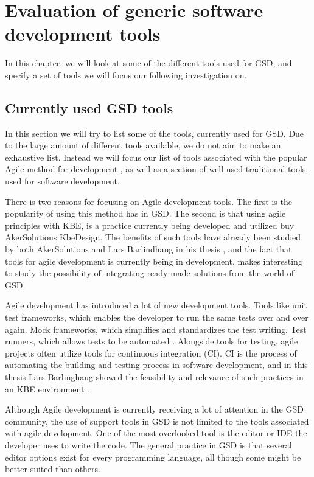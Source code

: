 \section{Evaluation of generic software development tools} %
\label{sec:evaluation_of_generic_software_development_tools}
In this chapter, we will look at some of the different tools used for GSD, and specify a set of tools we will focus our following investigation on.

\subsection{Currently used GSD tools} %
\label{sub:currently_used_gsd_tools}
In this section we will try to list some of the tools, currently used for GSD. Due to the large amount of different tools available, we do not aim to make an exhaustive list. Instead we will focus our list of tools associated with the popular Agile method for development , as well as a section of well used traditional tools, used for software development.

There is two reasons for focusing on Agile development tools. The first is the popularity of using this method has in GSD. The second is that using agile principles with KBE, is a practice currently being developed and utilized buy AkerSolutions KbeDesign. The benefits of such tools have already been studied by both AkerSolutions and Lars Barlindhaug in his thesis \citep{aunit}, and the fact that tools for agile development is currently being in development, makes interesting to study the possibility of integrating ready-made solutions from the world of GSD.

Agile development has introduced a lot of new development tools. Tools like unit test frameworks, which enables the developer to run the same tests over and over again. Mock frameworks, which simplifies and standardizes the test writing. Test runners, which allows tests to be automated \citep{agile_samurai} \citep{Martin:2008:CCH:1388398}. Alongside tools for testing, agile projects often utilize tools for continuous integration (CI). CI is the process of automating the building and testing process in software development, and in this thesis Lars Barlinghaug showed the feasibility and relevance of such practices in an KBE environment \citep{aunit}.

Although Agile development is currently receiving a lot of attention in the GSD community, the use of support tools in GSD is not limited to the tools associated with agile development. One of the most overlooked tool is the editor or IDE the developer uses to write the code. The general practice in GSD is that several editor options exist for every programming language, all though some might be better suited than others.

